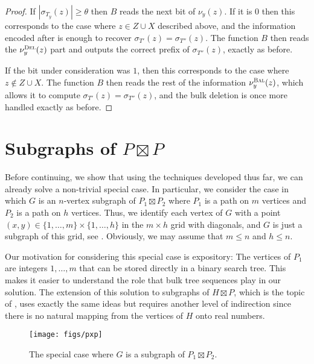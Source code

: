 \documentclass[kpfonts]{patmorin}
\let\leq\leqslant
\let\geq\geqslant
\begin{document}
\begin{proof}
  If $|\sigma_{T_y}(z)| \geq \theta$ then $B$ reads the next bit of $\nu_y(z)$. If it is $0$ then this corresponds to the case where $z\in Z\cup X$ described above, and the information encoded after is enough to recover  $\sigma_{T'}(z)=\sigma_{T''}(z)$. The function $B$ then reads the $\nu^{\textsc{Del}}_y(z)$ part and outputs the correct prefix of $\sigma_{T''}(z)$, exactly as before.

  If the bit under consideration was $1$, then this corresponds to the case where $z\not\in Z\cup X$. The function $B$ then reads the rest of the information $\nu^{\textsc{Bal}}_y(z)$, which allows it to compute $\sigma_{T'}(z)=\sigma_{T''}(z)$, and the bulk deletion is once more handled exactly as before.
\end{proof}


\section{Subgraphs of $P\boxtimes P$}

Before continuing, we show that using the techniques developed thus far, we can already solve a non-trivial special case.  In particular, we consider the case in which $G$ is an $n$-vertex subgraph of $P_1\boxtimes P_2$ where $P_1$ is a path on $m$ vertices and $P_2$ is a path on $h$ vertices.  Thus, we identify each vertex of $G$ with a point $(x,y)\in\{1,\ldots,m\}\times \{1,\ldots,h\}$ in the $m\times h$ grid with diagonals, and $G$ is just a subgraph of this grid, see .
Obviously, we may assume that $m\leq n$ and $h\leq n$.

Our motivation for considering this special case is expository: The vertices of $P_1$ are integers $1,\ldots,m$ that can be stored directly in a binary search tree. This makes it easier to understand the role that bulk tree sequences play in our solution.  The extension of this solution to subgraphs of $H\boxtimes P$, which is the topic of , uses exactly the same ideas but requires another level of indirection since there is no natural mapping from the vertices of $H$ onto real numbers.

\begin{figure}
  \begin{center}
    \texttt{[image: figs/pxp]}
  \end{center}
  \caption{The special case where $G$ is a subgraph of $P_1\boxtimes P_2$.}
\end{figure}
\end{document}
